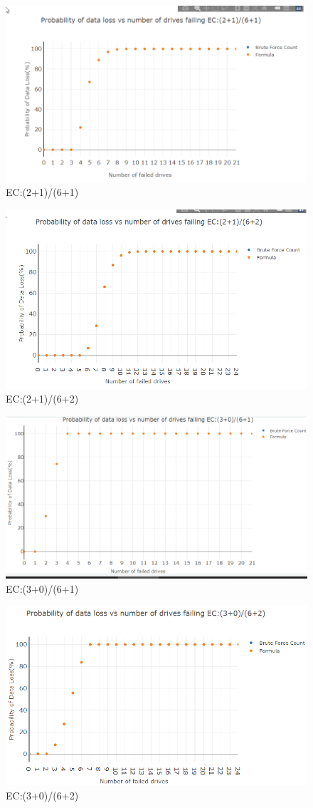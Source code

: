 \documentclass[journal]{IEEEtran}
\begin{document}
\begin{figure}[H]

{\centering \includegraphics[width=0.65\linewidth]{2161} 

}

\caption{EC:(2+1)/(6+1)}\label{fig:2161}
\end{figure}

\begin{figure}[H]

{\centering \includegraphics[width=0.65\linewidth]{2162} 

}

\caption{EC:(2+1)/(6+2)}\label{fig:2162}
\end{figure}

\begin{figure}[H]

{\centering \includegraphics[width=0.65\linewidth]{3061} 

}

\caption{EC:(3+0)/(6+1)}\label{fig:3061}
\end{figure}

\begin{figure}[H]

{\centering \includegraphics[width=0.65\linewidth]{3062} 

}

\caption{EC:(3+0)/(6+2)}\label{fig:3062}
\end{figure}

\newpage
\singlespacing 
\end{document}
